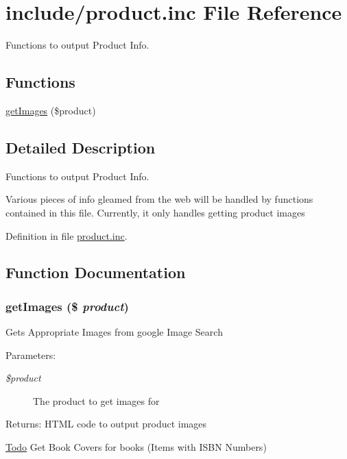 \hypertarget{product_8inc}{
\section{include/product.inc File Reference}
\label{product_8inc}
}
Functions to output Product Info. 

\subsection*{Functions}
\begin{CompactItemize}
\item 
\hyperlink{product_8inc_9dbb778854cfe105058d7161ca8f058c}{getImages} (\$product)
\end{CompactItemize}


\subsection{Detailed Description}
Functions to output Product Info. 

Various pieces of info gleamed from the web will be handled by functions contained in this file. Currently, it only handles getting product images 

Definition in file \hyperlink{product_8inc-source}{product.inc}.

\subsection{Function Documentation}
\hypertarget{product_8inc_9dbb778854cfe105058d7161ca8f058c}{
\subsubsection{\setlength{\rightskip}{0pt plus 5cm}getImages (\$ {\em product})}}
\label{product_8inc_9dbb778854cfe105058d7161ca8f058c}


Gets Appropriate Images from google Image Search \begin{Desc}
\item[Parameters:]
\begin{description}
\item[{\em \$product}]The product to get images for \end{description}
\end{Desc}
\begin{Desc}
\item[Returns:]HTML code to output product images\end{Desc}
\begin{Desc}
\item[\hyperlink{todo__todo000002}{Todo}]Get Book Covers for books (Items with ISBN Numbers) \end{Desc}


